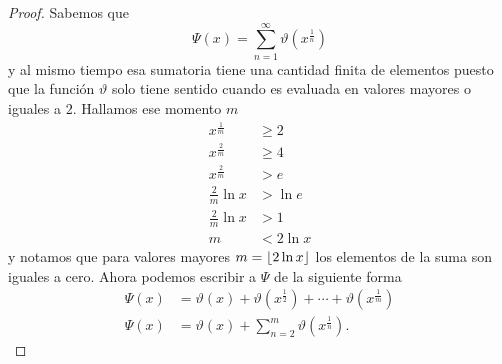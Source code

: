 \documentclass{article}
\DeclarePairedDelimiter\floor{\lfloor}{\rfloor}
\theoremstyle{definition}
\theoremstyle{remark}
\begin{document}
\begin{proof}
Sabemos que
$$\Psi(x) = \sum_{n = 1}^\infty \vartheta(x^\frac{1}{n})$$
y al mismo tiempo esa sumatoria tiene una cantidad finita de elementos puesto que la funci\'on $\vartheta$ 
solo tiene sentido cuando es evaluada en valores mayores o iguales a $2$. Hallamos ese momento $m$
\begin{align*}
x^\frac{1}{m} &\geq 2 \\
x^\frac{2}{m} &\geq 4 \\
x^\frac{2}{m} &> e \\
\frac{2}{m}\ln x &> \ln e \\
\frac{2}{m}\ln x &> 1 \\
m &< 2 \ln x
\end{align*}
y notamos que para valores mayores $m = \floor{2 \ln x}$ los elementos de la suma son iguales a cero.
Ahora podemos escribir a $\Psi$ de la siguiente forma
\begin{align*}
\Psi(x) &= \vartheta(x) + \vartheta(x^\frac{1}{2}) + \cdots + \vartheta(x^\frac{1}{m}) \\
\Psi(x) &= \vartheta(x) + \sum_{n = 2}^m \vartheta(x^\frac{1}{n}).
\end{align*}


\end{proof}
\end{document}
